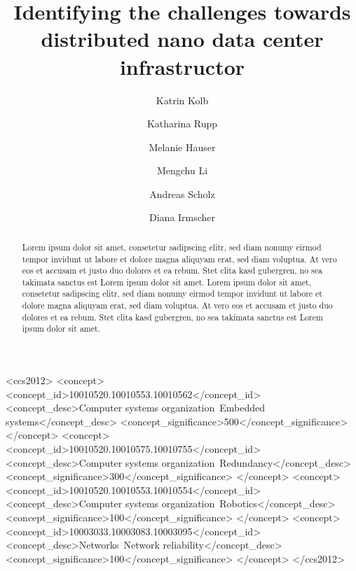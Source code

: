 \documentclass[format=acmsmall, review=false, screen=true]{acmart}
\begin{document}
\title[Identifying the challenges towards distributed nano data center infrastructor]{Identifying the challenges towards distributed nano data center infrastructor}  

\author{Katrin Kolb}
\author{Katharina Rupp}
\author{Melanie Hauser} 
\author{Mengchu Li}
\author{Andreas Scholz}
\author{Diana Irmscher}



\begin{abstract} %
Lorem ipsum dolor sit amet, consetetur sadipscing elitr, sed diam nonumy eirmod tempor invidunt ut labore et dolore magna aliquyam erat, sed diam voluptua. At vero eos et accusam et justo duo dolores et ea rebum. Stet clita kasd gubergren, no sea takimata sanctus est Lorem ipsum dolor sit amet. Lorem ipsum dolor sit amet, consetetur sadipscing elitr, sed diam nonumy eirmod tempor invidunt ut labore et dolore magna aliquyam erat, sed diam voluptua. At vero eos et accusam et justo duo dolores et ea rebum. Stet clita kasd gubergren, no sea takimata sanctus est Lorem ipsum dolor sit amet.
\end{abstract}

%
%
\begin{CCSXML}
<ccs2012>
 <concept>
  <concept_id>10010520.10010553.10010562</concept_id>
  <concept_desc>Computer systems organization~Embedded systems</concept_desc>
  <concept_significance>500</concept_significance>
 </concept>
 <concept>
  <concept_id>10010520.10010575.10010755</concept_id>
  <concept_desc>Computer systems organization~Redundancy</concept_desc>
  <concept_significance>300</concept_significance>
 </concept>
 <concept>
  <concept_id>10010520.10010553.10010554</concept_id>
  <concept_desc>Computer systems organization~Robotics</concept_desc>
  <concept_significance>100</concept_significance>
 </concept>
 <concept>
  <concept_id>10003033.10003083.10003095</concept_id>
  <concept_desc>Networks~Network reliability</concept_desc>
  <concept_significance>100</concept_significance>
 </concept>
</ccs2012>  
\end{CCSXML}
\end{document}
